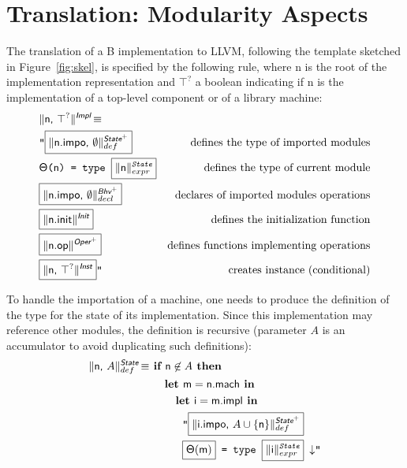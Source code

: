 \documentclass{llncs}
\newcommand{\trad}[2]{\ensuremath{\lVert \textsf{#1} \rVert^{\textit{#2}}}}
\newcommand{\nl}[0]{\ensuremath{\downarrow}}
\DeclareMathOperator{\isdef}{\equiv}
\newcommand{\llvm}[1]{\texttt{#1}}
\newcommand{\B}[1]{\textsf{#1}}
\newcommand{\ListOf}[1]{$\mbox{#1}^+$}
\newcommand{\IF}[0]{\textbf{ if }}
\newcommand{\THEN}[0]{\textbf{ then }}
\newcommand{\LET}[0]{\textbf{ let }}
\newcommand{\IN}[0]{\textbf{ in }}
\newcommand{\PH}[1]{\framebox{$#1$}}
\newcommand{\state}[0]{\ensuremath{\sf\Theta}}
\begin{document}
\section{Translation: Modularity Aspects}
\label{sec:module}

The translation of a B implementation to LLVM, following the template sketched
in Figure~\ref{fig:skel}, is specified by the following rule, where \B{n} is the
root of the implementation representation and $\top^?$ a boolean indicating if
\B{n} is the implementation of a top-level component or of a library machine:
\begin{align*}
  \lefteqn{\trad{\B{n}, $\top^?$}{\B{Impl}} \isdef } \\
  & \llvm{"\PH{\trad{\B{n.impo}, $\emptyset$}{\ListOf{\B{State}}}_{def}}} & \text{defines the type of imported modules} \\
  & \llvm{\state(\B{n}) = type \PH{\trad{n}{State}_{expr}}} & \text{defines the type of current module} \\
  & \llvm{\PH{\trad{\B{n.impo}, $\emptyset$}{\ListOf{\B{Bhv}}}_{decl}}} & \text{declares of imported modules operations} \\
  & \llvm{\PH{\trad{\B{n.init}}{\B{Init}}}} & \text{defines the initialization function} \\
  & \llvm{\PH{\trad{\B{n.op}}{\ListOf{\B{Oper}}}}} & \text{defines functions implementing operations}\\
  & \llvm{\PH{\trad{\B{n}, $\top^?$}{\B{Inst}}}"} & \text{creates instance (conditional)}
\end{align*}

To handle the importation of a machine, one needs to produce the definition of
the type for the state of its implementation. Since this implementation may reference
other modules, the definition is recursive (parameter $A$ is an accumulator to avoid
duplicating such definitions):
\begin{align*}
  \trad{\B{n}, $A$}{\B{State}}_{def} \isdef 
  & \IF \B{n} \not\in A \THEN \\
  & \quad \LET \B{m} = \B{n.mach} \IN \\
  & \quad \quad \LET \B{i} = \B{m.impl} \IN \\
  & \quad \quad \quad \llvm{"\PH{\trad{\B{i.impo}, $A \cup \{ \B{n} \}$}{\ListOf{\B{State}}}_{def}}} \\
  & \quad \quad \quad \llvm{\PH{\state(\B{m})} = type \PH{\trad{i}{State}_{expr}} \nl"}
\end{align*}
\end{document}
